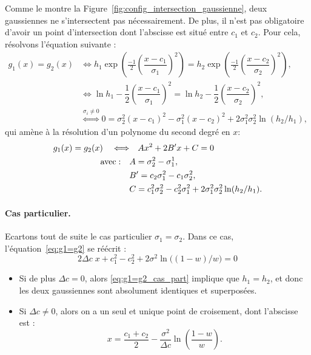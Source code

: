 \documentclass[main.tex]{subfiles}
\begin{document}
Comme le montre la Figure~\ref{fig:config_intersection_gaussienne}, deux gaussiennes ne s'intersectent pas nécessairement. De plus, il n'est pas obligatoire d'avoir un point d'intersection dont l'abscisse est situé entre $c_1$ et $c_2$. Pour cela, résolvons l'équation suivante :
\begin{align*}
g_1(x)=g_2(x) 
& \Leftrightarrow h_1\exp \left(\frac{-1}{2} \left( \dfrac{x-c_1}{\sigma_1}\right)^2  \right) = h_2\exp \left(\frac{-1}{2} \left( \dfrac{x-c_2}{\sigma_2}\right)^2  \right), \\
& \Leftrightarrow \ln h_1 - \dfrac{1}{2}\left( \dfrac{x-c_1}{\sigma_1} \right)^2 = \ln h_2 - \dfrac{1}{2}\left( \dfrac{x-c_2}{\sigma_2} \right)^2, \\
& \overset{\sigma_i \neq 0}{\Leftrightarrow} 0 = \sigma_2^2 (x-c_1)^2 - \sigma_1^2 (x-c_2)^2 + 2\sigma_1^2\sigma_2^2 \ln( h_2 / h_1 ),
\end{align*}
qui amène à la résolution d'un polynome du second degré en $x$:
\begin{equation}
\begin{aligned}
\label{eq:g1=g2}
g_1(x)=g_2(x) \quad \Longleftrightarrow & \quad  Ax^2 + 2B'x + C =0 \\
{\rm avec :} \quad &A=\sigma_2^2 - \sigma_1^1, \\
& B'=c_2\sigma_1^2-c_1\sigma_2^2,\\
& C= c_1^2\sigma_2^2-c_2^2\sigma_1^2 +  2\sigma_1^2\sigma_2^2 \ln( h_2 / h_1 ).
\end{aligned}
\end{equation}
\paragraph{Cas particulier.}
Ecartons tout de suite le cas particulier $\sigma_1=\sigma_2$. %
Dans ce cas, l'équation~\eqref{eq:g1=g2} se réécrit :
\begin{equation}
\label{eq:g1=g2_cas_part}
2\Delta c \; x + c_1^2-c_2^2 +  2 \sigma^2 \ln \big( (1-w) / w \big) = 0
\end{equation}
\begin{itemize}
\item Si de plus $\Delta c=0$, alors \eqref{eq:g1=g2_cas_part} implique que $h_1=h_2$, et donc les deux gaussiennes sont absolument identiques et superposées.
\item Si $\Delta c\neq0$, alors on a un seul et unique point de croisement, dont l'abscisse est :
\begin{equation}
\label{eq:pt_croisement_unique}
x=\dfrac{c_1+c_2}{2}-\dfrac{\sigma^2}{\Delta c}\ln \left( \dfrac{1-w}{w} \right).
\end{equation}
\end{itemize}
\end{document}
